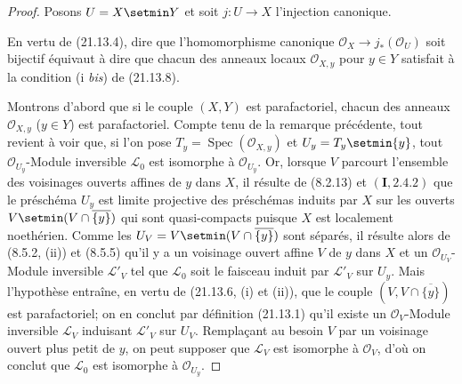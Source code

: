 \begin{proof}
Posons $U=X\setmin Y$ et soit $j:U\to X$ l'injection canonique.

En vertu de (21.13.4), dire que l'homomorphisme canonique
$\mathcal O_X\to j_*(\mathcal O_U)$ soit bijectif équivaut à dire que chacun des
anneaux locaux $\mathcal O_{X,y}$ pour $y\in Y$ satisfait à la condition (i \emph{bis}) de
(21.13.8).

Montrons d'abord que si le couple $(X,Y)$ est parafactoriel, chacun des anneaux
$\mathcal O_{X,y}$ ($y\in Y$) est parafactoriel. Compte tenu de la remarque
précédente, tout revient à voir que, si l'on pose
$T_y=\operatorname{Spec}(\mathcal O_{X,y})$ et $U_y=T_y\setmin\{y\}$, tout
$\mathcal O_{U_y}$-Module inversible $\mathscr L_0$ est isomorphe à
$\mathcal O_{U_y}$. Or, lorsque $V$ parcourt l'ensemble des voisinages ouverts
affines de $y$ dans $X$, il résulte de (8.2.13) et $(\mathbf I, 2.4.2)$ que le
préschéma $U_y$ est limite projective des préschémas induits par $X$ sur les ouverts
$V\setmin(V\cap\overline{\{y\}})$ qui sont quasi-compacts puisque $X$ est localement
noethérien. Comme les $U_V=V\setmin(V\cap\overline{\{y\}})$ sont séparés, il résulte alors de
(8.5.2, (ii)) et (8.5.5) qu'il y a un voisinage ouvert affine $V$ de $y$ dans $X$ et
un $\mathcal O_{U_V}$-Module inversible $\mathscr L'_V$ tel que $\mathscr L_0$ soit le
faisceau induit par $\mathscr L'_V$ sur $U_y$. Mais l'hypothèse entraîne, en vertu de
(21.13.6, (i) et (ii)), que le couple $(V,V\cap\overline{\{y\}})$ est parafactoriel;
on en conclut par définition (21.13.1) qu'il existe un $\mathcal O_V$-Module inversible
$\mathscr L_V$ induisant $\mathscr L'_V$ sur $U_V$. Remplaçant au besoin $V$ par un
voisinage ouvert plus petit de $y$, on peut supposer que $\mathscr L_V$ est isomorphe
à $\mathcal O_V$, d'où on conclut que $\mathscr L_0$ est isomorphe à
$\mathcal O_{U_y}$.


\end{proof}

